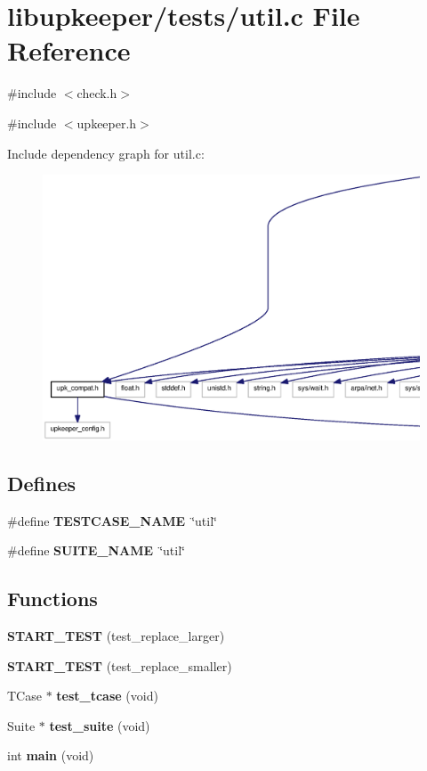 \section{libupkeeper/tests/util.c File Reference}
\label{util_8c}
{\ttfamily \#include $<$check.h$>$}\par
{\ttfamily \#include $<$upkeeper.h$>$}\par
Include dependency graph for util.c:\nopagebreak
\begin{figure}[H]
\begin{center}
\leavevmode
\includegraphics[width=400pt]{util_8c__incl}
\end{center}
\end{figure}
\subsection*{Defines}
\begin{DoxyCompactItemize}
\item 
\#define {\bf TESTCASE\_\-NAME}~\char`\"{}util\char`\"{}
\item 
\#define {\bf SUITE\_\-NAME}~\char`\"{}util\char`\"{}
\end{DoxyCompactItemize}
\subsection*{Functions}
\begin{DoxyCompactItemize}
\item 
{\bf START\_\-TEST} (test\_\-replace\_\-larger)
\item 
{\bf START\_\-TEST} (test\_\-replace\_\-smaller)
\item 
TCase $\ast$ {\bf test\_\-tcase} (void)
\item 
Suite $\ast$ {\bf test\_\-suite} (void)
\item 
int {\bf main} (void)
\end{DoxyCompactItemize}
